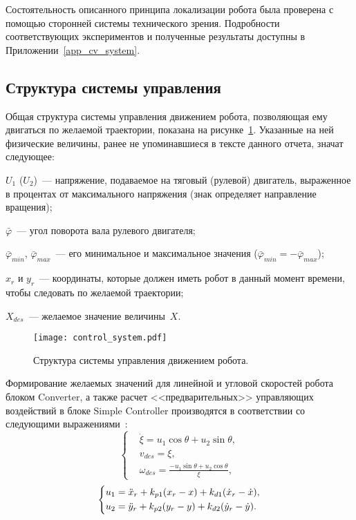 Состоятельность описанного принципа локализации робота была проверена с помощью сторонней системы технического зрения.
Подробности соответствующих экспериментов и полученные результаты доступны в Приложении~\ref{app_cv_system}.



\subsection{Структура системы управления}
Общая структура системы управления движением робота, позволяющая ему двигаться по желаемой траектории, показана на рисунке~\ref{img_control_system}.
Указанные на ней физические величины, ранее не упоминавшиеся в тексте данного отчета, значат следующее:
\begin{ESKDexplanation}
    \item $U_1$ ($U_2$)~--- напряжение, подаваемое на тяговый (рулевой) двигатель, выраженное в процентах от максимального напряжения (знак определяет направление вращения);
    \item $\bar\varphi$~--- угол поворота вала рулевого двигателя;
    \item $\bar{\varphi}_{min}$, $\bar{\varphi}_{max}$~--- его минимальное и максимальное значения ($\bar{\varphi}_{min} = -\bar{\varphi}_{max}$);
    \item $x_r$ и $y_r$~--- координаты, которые должен иметь робот в данный момент времени, чтобы следовать по желаемой траектории;
    \item $X_{des}$~--- желаемое значение величины~$X$.
\end{ESKDexplanation}

\vspace{0.5cm}

\begin{figure}[h]
    \centering
    \texttt{[image: control\_system.pdf]}
    \vspace{0.0cm}
    \caption{Структура системы управления движением робота.}
    \label{img_control_system}
\end{figure}

Формирование желаемых значений для линейной и угловой скоростей робота блоком Converter, а также расчет <<предварительных>> управляющих воздействий в блоке Simple Controller производятся в соответствии со следующими выражениями~\cite{de_luca}:
\begin{equation}
    \left\{
    \begin{aligned}
        & \dot{\xi} = u_1 \cos \theta + u_2 \sin \theta, \\
        & v_{des} = \xi, \\
        & \omega_{des} = \frac{-u_1 \sin \theta + u_2 \cos \theta}{\xi},
    \end{aligned}
    \right.
\end{equation}
\begin{equation}
    \left\{
    \begin{aligned}
        & u_1 = \ddot{x}_r + k_{p1} (x_r - x) + k_{d1} (\dot{x}_r - \dot{x}), \\
        & u_2 = \ddot{y}_r + k_{p2} (y_r - y) + k_{d2} (\dot{y}_r - \dot{y})\ldotp
    \end{aligned}
    \right.
\end{equation}
